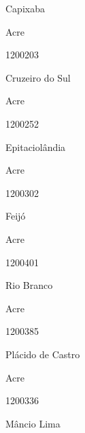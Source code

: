 \documentclass[
  letterpaper,
]{report}
\begin{document}
\n      

Capixaba

\n    

\n    

\n      

Acre

\n      

1200203

\n      

Cruzeiro do Sul

\n    

\n    

\n      

Acre

\n      

1200252

\n      

Epitaciolândia

\n    

\n    

\n      

Acre

\n      

1200302

\n      

Feijó

\n    

\n    

\n      

Acre

\n      

1200401

\n      

Rio Branco

\n    

\n    

\n      

Acre

\n      

1200385

\n      

Plácido de Castro

\n    

\n    

\n      

Acre

\n      

1200336

\n      

Mâncio Lima

\n    

\n    

\n      
\end{document}
